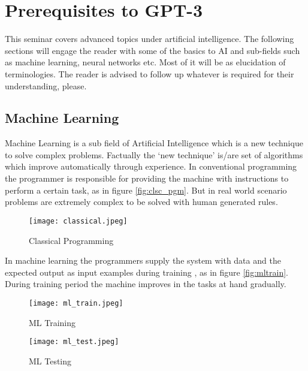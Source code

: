 \chapter*{Prerequisites to GPT-3}
\label{chap:prereq}
\thispagestyle{fancy}

\hspace{0.5cm} This seminar covers advanced topics under artificial intelligence. The following sections will engage the reader with some of the basics to AI and sub-fields such as machine learning, neural networks etc. Most of it will be as elucidation of terminologies. The reader is advised to follow up whatever is required for their understanding, please.

\section*{Machine Learning}
\label{sec:mchlrn}

\hspace{0.5cm} Machine Learning is a sub field of Artificial Intelligence which is a new technique to solve complex problems. Factually the `new technique' is/are set of algorithms which improve automatically through experience. In conventional programming the programmer is responsible for providing the machine with instructions to perform a certain task, as in figure \eqref{fig:clsc_pgm}. But in real world scenario problems are extremely complex to be solved with human generated rules.

\begin{figure}[!htbp]
    \centering
    \texttt{[image: classical.jpeg]}
    \caption[Classical Programming]{Classical Programming}
    \label{fig:clsc_pgm}
\end{figure}

In machine learning the programmers supply the system with data and the expected output as input examples during training \cite{devto:urfstai}, as in figure \eqref{fig:mltrain}. During training period the machine improves in the tasks at hand gradually.

\begin{figure}[!htbp]
    \centering
    \begin{minipage}{0.45\textwidth}
        \centering
        \texttt{[image: ml\_train.jpeg]}
        \caption[ML Training]{\centering ML Training }
        \label{fig:mltrain}
    \end{minipage}\hfill
    \begin{minipage}{0.45\textwidth}
        \centering
        \texttt{[image: ml\_test.jpeg]}
        \caption[ML Testing]{\centering ML Testing}
        \label{fig:mltest}
    \end{minipage}
\end{figure}

